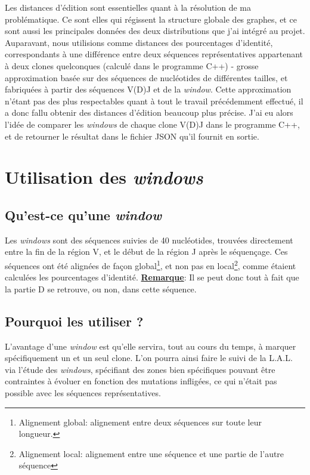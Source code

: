 \documentclass[pdftex,12pt,a4paper]{report}
\begin{document}
\begin{spacing}{1.2}
Les distances d'édition sont essentielles quant à la résolution de ma problématique. Ce sont elles qui régissent la structure globale des graphes, et ce sont aussi les principales données des deux distributions que j'ai intégré au projet.
\newline
Auparavant, nous utilisions comme distances des pourcentages d'identité, correspondants à une différence entre deux séquences représentatives appartenant à deux clones quelconques (calculé dans le programme C++) - grosse approximation basée sur des séquences de nucléotides de différentes tailles, et fabriquées à partir des séquences V(D)J et de la \textit{window}. Cette approximation n'étant pas des plus respectables quant à tout le travail précédemment effectué, il a donc fallu obtenir des distances d'édition beaucoup plus précise. J'ai eu alors l'idée de comparer les \textit{windows} de chaque clone V(D)J dans le programme C++, et de retourner le résultat dans le fichier JSON qu'il fournit en sortie.

\section{Utilisation des \textit{windows}}

\subsection{Qu'est-ce qu'une \textit{window}}

Les \textit{windows} sont des séquences suivies de 40 nucléotides, trouvées directement entre la fin de la région V, et le début de la région J après le séquençage. Ces séquences ont été alignées de façon global\footnote{Alignement global: alignement entre deux séquences sur toute leur longueur.}, et non pas en local\footnote{Alignement local: alignement entre une séquence et une partie de l'autre séquence}, comme étaient calculées les pourcentages d'identité.
\newline
\underline{\textbf{Remarque}}: Il se peut donc tout à fait que la partie D se retrouve, ou non, dans cette séquence.

\subsection{Pourquoi les utiliser ?}

L'avantage d'une \textit{window} est qu'elle servira, tout au cours du temps, à marquer spécifiquement un et un seul clone. L'on pourra ainsi faire le suivi de la L.A.L. via l'étude des \textit{windows}, spécifiant des zones bien spécifiques pouvant être contraintes à évoluer en fonction des mutations infligées, ce qui n'était pas possible avec les séquences représentatives.


\end{spacing}
\end{document}
